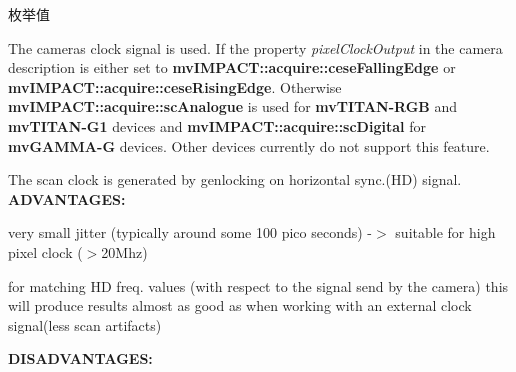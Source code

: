 \begin{Desc}
\item[枚举值]\par
\begin{description}
\item[{\em 
\hypertarget{group___device_specific_interface_ggaeb51ae9af79746e86fa53a85691fd043a00474cad255c5b4b767b93c14613145e}{sc\+Auto}\label{group___device_specific_interface_ggaeb51ae9af79746e86fa53a85691fd043a00474cad255c5b4b767b93c14613145e}
}]The cameras clock signal is used. If the property {\itshape pixel\+Clock\+Output} in the camera description is either set to {\bfseries mv\+I\+M\+P\+A\+C\+T\+::acquire\+::cese\+Falling\+Edge} or {\bfseries mv\+I\+M\+P\+A\+C\+T\+::acquire\+::cese\+Rising\+Edge}. Otherwise {\bfseries mv\+I\+M\+P\+A\+C\+T\+::acquire\+::sc\+Analogue} is used for {\bfseries mv\+T\+I\+T\+A\+N-\/\+R\+G\+B} and {\bfseries mv\+T\+I\+T\+A\+N-\/\+G1} devices and {\bfseries mv\+I\+M\+P\+A\+C\+T\+::acquire\+::sc\+Digital} for {\bfseries mv\+G\+A\+M\+M\+A-\/\+G} devices. Other devices currently do not support this feature. \item[{\em 
\hypertarget{group___device_specific_interface_ggaeb51ae9af79746e86fa53a85691fd043a7b4954fe6f9c3418b38a382f91c7b644}{sc\+Analogue}\label{group___device_specific_interface_ggaeb51ae9af79746e86fa53a85691fd043a7b4954fe6f9c3418b38a382f91c7b644}
}]The scan clock is generated by genlocking on horizontal sync.(H\+D) signal. {\bfseries A\+D\+V\+A\+N\+T\+A\+G\+E\+S\+:} ~\newline

\begin{DoxyItemize}
\item very small jitter (typically around some 100 pico seconds) -\/$>$ suitable for high pixel clock ($>$20\+Mhz)
\item for matching H\+D freq. values (with respect to the signal send by the camera) this will produce results almost as good as when working with an external clock signal(less scan artifacts)
\end{DoxyItemize}

{\bfseries D\+I\+S\+A\+D\+V\+A\+N\+T\+A\+G\+E\+S\+:} ~\newline


\end{description}
\end{Desc}
